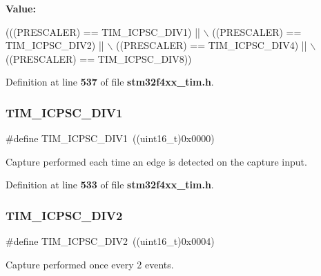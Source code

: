 {\bfseries Value\+:}
\begin{DoxyCode}
(((PRESCALER) == TIM_ICPSC_DIV1) || \(\backslash\)
                                        ((PRESCALER) == TIM_ICPSC_DIV2) || \(\backslash\)
                                        ((PRESCALER) == TIM_ICPSC_DIV4) || \(\backslash\)
                                        ((PRESCALER) == TIM_ICPSC_DIV8))
\end{DoxyCode}


Definition at line \textbf{ 537} of file \textbf{ stm32f4xx\+\_\+tim.\+h}.

\mbox{\label{group__TIM__Input__Capture__Prescaler_ga8acb44abe3147d883685c1f9f1ce410e}} 
\subsubsection{T\+I\+M\+\_\+\+I\+C\+P\+S\+C\+\_\+\+D\+I\+V1}
{\footnotesize\ttfamily \#define T\+I\+M\+\_\+\+I\+C\+P\+S\+C\+\_\+\+D\+I\+V1~((uint16\+\_\+t)0x0000)}

Capture performed each time an edge is detected on the capture input. 

Definition at line \textbf{ 533} of file \textbf{ stm32f4xx\+\_\+tim.\+h}.

\mbox{\label{group__TIM__Input__Capture__Prescaler_ga1d8a7b66add914e2ddd910d2d700978f}} 
\subsubsection{T\+I\+M\+\_\+\+I\+C\+P\+S\+C\+\_\+\+D\+I\+V2}
{\footnotesize\ttfamily \#define T\+I\+M\+\_\+\+I\+C\+P\+S\+C\+\_\+\+D\+I\+V2~((uint16\+\_\+t)0x0004)}

Capture performed once every 2 events. 

